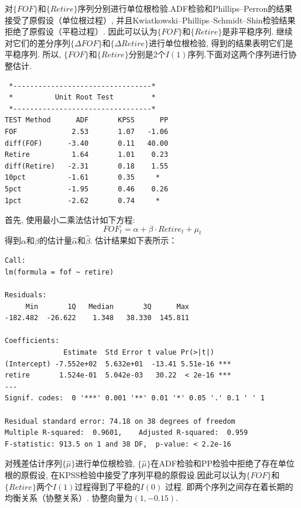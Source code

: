 对$\{FOF\}$和$\{Retire\}$序列分别进行单位根检验.ADF检验和Phillips–Perron的结果接受了原假设（单位根过程）, 并且Kwiatkowski–Phillips–Schmidt–Shin检验结果拒绝了原假设（平稳过程）. 因此可以认为$\{FOF\}$和$\{Retire\}$是非平稳序列.
继续对它们的差分序列$\{\Delta FOF\}$和$\{\Delta Retire\}$进行单位根检验, 得到的结果表明它们是平稳序列. 所以, $\{FOF\}$和$\{Retire\}$分别是2个$I(1)$序列.下面对这两个序列进行协整估计.

\begin{framed}
\begin{verbatim}
 *---------------------------------*                         
 *          Unit Root Test         *                           
 *---------------------------------*
TEST Method      ADF       KPSS      PP  
FOF             2.53       1.07   -1.06
diff(FOF)      -3.40       0.11   40.00
Retire          1.64       1.01    0.23
diff(Retire)   -2.31       0.18    1.55
10pct          -1.61       0.35     *  
5pct           -1.95       0.46    0.26
1pct           -2.62       0.74     *  
\end{verbatim}
\end{framed}


首先, 使用最小二乘法估计如下方程:
$$FOF_t = \alpha + \beta \cdot Retire_t + \mu_t$$
得到$\alpha$和$\beta$的估计量$\hat{\alpha}$和$\hat{\beta}$. 估计结果如下表所示：

\begin{framed}
\begin{verbatim} 
Call:
lm(formula = fof ~ retire)

Residuals:
     Min       1Q   Median       3Q      Max 
-182.482  -26.622    1.348   38.330  145.811 

Coefficients:
              Estimate  Std Error t value Pr(>|t|)    
(Intercept) -7.552e+02  5.632e+01  -13.41 5.51e-16 ***
retire       1.524e-01  5.042e-03   30.22  < 2e-16 ***
---
Signif. codes:  0 '***' 0.001 '**' 0.01 '*' 0.05 '.' 0.1 ' ' 1

Residual standard error: 74.18 on 38 degrees of freedom
Multiple R-squared:  0.9601,    Adjusted R-squared:  0.959 
F-statistic: 913.5 on 1 and 38 DF,  p-value: < 2.2e-16
\end{verbatim}
\end{framed}



对残差估计序列$\{\hat{\mu}\}$进行单位根检验, $\{\hat{\mu}\}$在ADF检验和PP检验中拒绝了存在单位根的原假设, 在KPSS检验中接受了序列平稳的原假设.因此可以认为$\{FOF\}$和$\{Retire\}$两个$I(1)$过程得到了平稳的$I(0)$
过程. 即两个序列之间存在着长期的均衡关系（协整关系）. 协整向量为$(1, -0.15)$.

